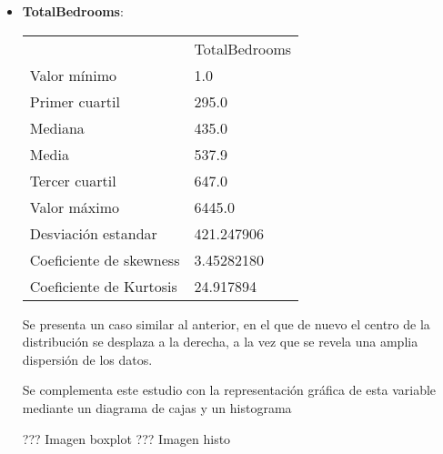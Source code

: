 {\begin{itemize}
Los resultados estadísticos hacen referencia a una distribución desplazada a la izquierda. El coeficiente de Kurtosis obtenido se traduce en una amplia dispersión de los datos respecto al centro de distribución de estos, siendo en este caso, a diferencia de los anteriores, muy probable la existencia de outliers situados a la derecha.

Se complementa este estudio con la representación gráfica de esta variable mediante un diagrama de cajas y un histograma

??? Imagen boxplot
??? Imagen histo


	
	\item \textbf{TotalBedrooms}: 
	\begin{table}[]
		\begin{tabular}{ll}
			& TotalBedrooms \\
			Valor mínimo            & 1.0           \\
			Primer cuartil          & 295.0         \\
			Mediana                 & 435.0         \\
			Media                   & 537.9         \\
			Tercer cuartil          & 647.0         \\
			Valor máximo            & 6445.0        \\ \hline
			Desviación estandar     & 421.247906    \\ \hline
			Coeficiente de skewness & 3.45282180    \\
			Coeficiente de Kurtosis & 24.917894    
		\end{tabular}
	\end{table}

Se presenta un caso similar al anterior, en el que de nuevo el centro de la distribución se desplaza a la derecha, a la vez que se revela una amplia dispersión de los datos. 

Se complementa este estudio con la representación gráfica de esta variable mediante un diagrama de cajas y un histograma

??? Imagen boxplot
??? Imagen histo 



\end{itemize}}
